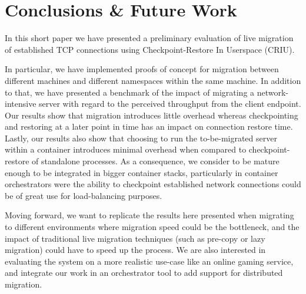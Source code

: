 \section{Conclusions \& Future Work} \label{sec:conclusion}

In this short paper we have presented a preliminary evaluation of live migration of established TCP connections using Checkpoint-Restore In Userspace (CRIU).

In particular, we have implemented proofs of concept for migration between different machines and different namespaces within the same machine.
In addition to that, we have presented a benchmark of the impact of migrating a network-intensive server with regard to the perceived throughput from the client endpoint.
Our results show that migration introduces little overhead whereas checkpointing and restoring at a later point in time has an impact on connection restore time.
Lastly, our results also show that choosing to run the to-be-migrated server within a \runc container introduces minimal overhead when compared to checkpoint-restore of standalone processes.
As a consequence, we consider \criu to be mature enough to be integrated in bigger container stacks, particularly in container orchestrators were the ability to checkpoint established network connections could be of great use for load-balancing purposes.

Moving forward, we want to replicate the results here presented when migrating to different environments where migration speed could be the bottleneck, and the impact of traditional live migration techniques (such as pre-copy or lazy migration) could have to speed up the process.
We are also interested in evaluating the system on a more realistic use-case like an online gaming service, and integrate our work in an orchestrator tool to add support for distributed migration.

